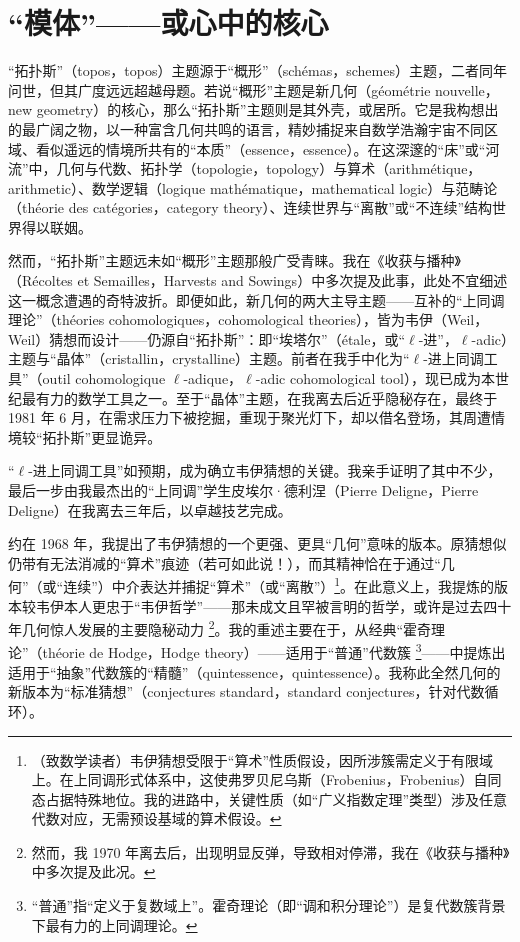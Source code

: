 \section{“模体”——或心中的核心}

“拓扑斯”（topos，topos）主题源于“概形”（schémas，schemes）主题，二者同年问世，但其广度远远超越母题。若说“概形”主题是新几何（géométrie nouvelle，new geometry）的核心，那么“拓扑斯”主题则是其外壳，或居所。它是我构想出的最广阔之物，以一种富含几何共鸣的语言，精妙捕捉来自数学浩瀚宇宙不同区域、看似遥远的情境所共有的“本质”（essence，essence）。在这深邃的“床”或“河流”中，几何与代数、拓扑学（topologie，topology）与算术（arithmétique，arithmetic）、数学逻辑（logique mathématique，mathematical logic）与范畴论（théorie des catégories，category theory）、连续世界与“离散”或“不连续”结构世界得以联姻。

然而，“拓扑斯”主题远未如“概形”主题那般广受青睐。我在《收获与播种》（Récoltes et Semailles，Harvests and Sowings）中多次提及此事，此处不宜细述这一概念遭遇的奇特波折。即便如此，新几何的两大主导主题——互补的“上同调理论”（théories cohomologiques，cohomological theories），皆为韦伊（Weil，Weil）猜想而设计——仍源自“拓扑斯”：即“埃塔尔”（étale，或“$\ell$-进”，$\ell$-adic）主题与“晶体”（cristallin，crystalline）主题。前者在我手中化为“$\ell$-进上同调工具”（outil cohomologique $\ell$-adique，$\ell$-adic cohomological tool），现已成为本世纪最有力的数学工具之一。至于“晶体”主题，在我离去后近乎隐秘存在，最终于 1981 年 6 月，在需求压力下被挖掘，重现于聚光灯下，却以借名登场，其周遭情境较“拓扑斯”更显诡异。

“$\ell$-进上同调工具”如预期，成为确立韦伊猜想的关键。我亲手证明了其中不少，最后一步由我最杰出的“上同调”学生皮埃尔·德利涅（Pierre Deligne，Pierre Deligne）在我离去三年后，以卓越技艺完成。

约在 1968 年，我提出了韦伊猜想的一个更强、更具“几何”意味的版本。原猜想似仍带有无法消减的“算术”痕迹（若可如此说！），而其精神恰在于通过“几何”（或“连续”）中介表达并捕捉“算术”（或“离散”）\footnote{（致数学读者）韦伊猜想受限于“算术”性质假设，因所涉簇需定义于有限域上。在上同调形式体系中，这使弗罗贝尼乌斯（Frobenius，Frobenius）自同态占据特殊地位。我的进路中，关键性质（如“广义指数定理”类型）涉及任意代数对应，无需预设基域的算术假设。}。在此意义上，我提炼的版本较韦伊本人更忠于“韦伊哲学”——那未成文且罕被言明的哲学，或许是过去四十年几何惊人发展的主要隐秘动力 \footnote{然而，我 1970 年离去后，出现明显反弹，导致相对停滞，我在《收获与播种》中多次提及此况。}。我的重述主要在于，从经典“霍奇理论”（théorie de Hodge，Hodge theory）——适用于“普通”代数簇 \footnote{“普通”指“定义于复数域上”。霍奇理论（即“调和积分理论”）是复代数簇背景下最有力的上同调理论。}——中提炼出适用于“抽象”代数簇的“精髓”（quintessence，quintessence）。我称此全然几何的新版本为“标准猜想”（conjectures standard，standard conjectures，针对代数循环）。

